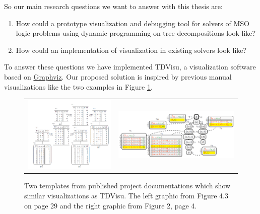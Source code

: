 \documentclass[a4paper, 12pt, bibliography=totoc]{scrartcl}
\begin{document}
So our main research questions we want to answer with this thesis are:
\begin{enumerate}
	\item How could a prototype visualization and debugging tool for solvers of MSO logic problems using dynamic programming on tree decompositions look like?
	\item How could an implementation of visualization in existing solvers look like?
\end{enumerate}
\noindent
To answer these questions we have implemented TDVisu, a visualization software based on \href{https://graphviz.org/}{Graphviz}. 
Our proposed solution is inspired by previous manual visualizations like the two examples in Figure \ref{fig:prevvisus}.
\begin{figure}[h]
	
	\centering
	\begin{tabularx}{\textwidth}{ X X }
		\includegraphics[width=1.05\linewidth,valign=c]{images/DualDA43.png} &  
		\includegraphics[width=1.02\linewidth,valign=c]{images/dpdbVisuSat.png}\\ 
		
	\end{tabularx}	
	
	\caption{Two templates from published project documentations which show similar visualizations as TDVisu. The left graphic from \cite{DiplomarbeitZisser} Figure 4.3 on page 29 and the right graphic from \cite{dpdbpadl2020} Figure 2, page 4.}
	\label{fig:prevvisus}
\end{figure}
\end{document}

